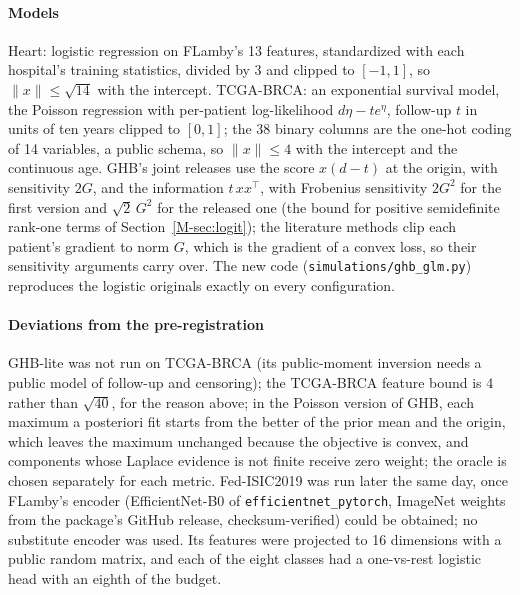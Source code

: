 \documentclass[acmsmall,screen,nonacm]{acmart}
\theoremstyle{acmdefinition}
\begin{document}
\paragraph{Models} Heart: logistic regression on FLamby's 13 features, standardized with each hospital's training statistics, divided by 3 and clipped to $[-1,1]$, so $\|x\|\le\sqrt{14}$ with the intercept. TCGA-BRCA: an exponential survival model, the Poisson regression with per-patient log-likelihood $d\eta-t e^{\eta}$, follow-up $t$ in units of ten years clipped to $[0,1]$; the 38 binary columns are the one-hot coding of 14 variables, a public schema, so $\|x\|\le4$ with the intercept and the continuous age. GHB's joint releases use the score $x(d-t)$ at the origin, with sensitivity $2G$, and the information $t\,xx^\top$, with Frobenius sensitivity $2G^2$ for the first version and $\sqrt2\,G^2$ for the released one (the bound for positive semidefinite rank-one terms of Section~\ref{M-sec:logit}); the literature methods clip each patient's gradient to norm $G$, which is the gradient of a convex loss, so their sensitivity arguments carry over. The new code (\texttt{simulations/ghb\_glm.py}) reproduces the logistic originals exactly on every configuration.

\paragraph{Deviations from the pre-registration} GHB-lite was not run on TCGA-BRCA (its public-moment inversion needs a public model of follow-up and censoring); the TCGA-BRCA feature bound is 4 rather than $\sqrt{40}$, for the reason above; in the Poisson version of GHB, each maximum a posteriori fit starts from the better of the prior mean and the origin, which leaves the maximum unchanged because the objective is convex, and components whose Laplace evidence is not finite receive zero weight; the oracle is chosen separately for each metric. Fed-ISIC2019 was run later the same day, once FLamby's encoder (EfficientNet-B0 of \texttt{efficientnet\_pytorch}, ImageNet weights from the package's GitHub release, checksum-verified) could be obtained; no substitute encoder was used. Its features were projected to 16 dimensions with a public random matrix, and each of the eight classes had a one-vs-rest logistic head with an eighth of the budget.
\end{document}
